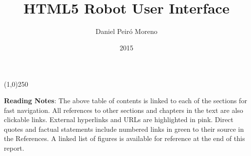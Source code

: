 \documentclass[12pt,twoside,a4paper]{report}
\title{HTML5 Robot User Interface}
\author{Daniel Peiró Moreno}
\date{2015}
\begin{document}
\maketitle
\newpage\null\thispagestyle{empty}\newpage

\newpage\null\thispagestyle{empty}\newpage

\newpage\null\thispagestyle{empty}\newpage
\tableofcontents
\begin{center}
\line(1,0){250}
\end{center}
\textbf{Reading Notes}: The above table of contents is linked to each of the sections for fast navigation. All references
to other sections and chapters in the text are also clickable links. External hyperlinks and URLs are highlighted in pink. 
Direct quotes and factual statements include numbered links in green to their source in the References. A linked list of 
figures is available for reference at the end of this report.




\newpage\null\thispagestyle{empty}\newpage



\newpage\null\thispagestyle{empty}\newpage



\newpage\null\thispagestyle{empty}\newpage

\newpage\null\thispagestyle{empty}\newpage

\listoffigures
\printindex
\end{document}
